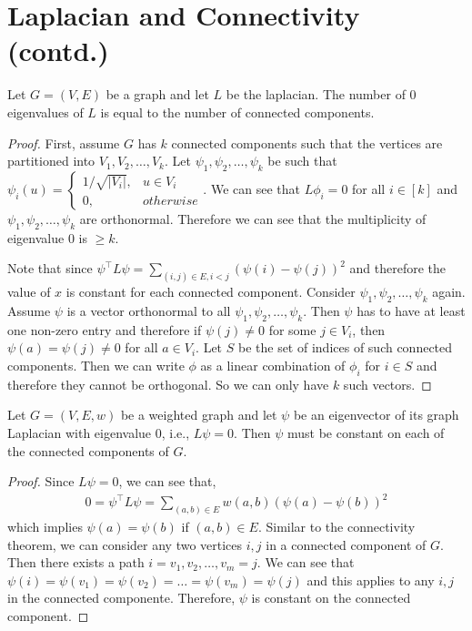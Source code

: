 \documentclass[11pt,letterpaper]{article}
\begin{document}
\section{Laplacian and Connectivity (contd.)}
\begin{theorem}
Let $G=(V,E)$ be a graph and let $L$ be the laplacian. The number of $0$ eigenvalues of $L$ is equal to the number of connected components.
\end{theorem}
\begin{proof}
First, assume $G$ has $k$ connected components such that the vertices are partitioned into $V_1,V_2,\dots,V_k$. Let $\psi_1,\psi_2,\dots,\psi_k$ be such that $\psi_i(u) = \begin{cases} 1/\sqrt{|V_i|}, & u\in V_i \\ 0, & otherwise\end{cases}$. We can see that $L\phi_i = 0$ for all $i \in [k]$ and $\psi_1,\psi_2,\dots,\psi_k$ are orthonormal. Therefore we can see that the multiplicity of eigenvalue $0$ is $\ge k$.

Note that since $\psi^\top L \psi = \sum_{(i,j) \in E, i<j}\left(\psi(i)-\psi(j)\right)^2$ and therefore the value of $x$ is constant for each connected component. Consider $\psi_1,\psi_2,\dots,\psi_k$ again. Assume $\psi$ is a vector orthonormal to all $\psi_1,\psi_2,\dots,\psi_k$. Then $\psi$ has to have at least one non-zero entry and therefore if $\psi(j) \neq 0$ for some $j \in V_i$, then $\psi(a) = \psi(j) \neq 0$ for all $a \in V_i$. Let $S$ be the set of indices of such connected components. Then we can write $\phi$ as a linear combination of $\phi_i$ for $i \in S$ and therefore they cannot be orthogonal. So we can only have $k$ such vectors. 
\end{proof}
\begin{theorem}
Let $G = (V,E,w)$ be a weighted graph and let $\psi$ be an eigenvector of its graph Laplacian with eigenvalue $0$, i.e., $L\psi = 0$. Then $\psi$ must be constant on each of the connected components of $G$.
\end{theorem}
\begin{proof}
Since $L\psi = 0$, we can see that,
\begin{align*}
0= \psi^\top L \psi = \sum_{(a,b) \in E} w(a,b) \left(\psi(a)-\psi(b)\right)^2
\end{align*}
which implies $\psi(a) = \psi(b)$ if $(a,b) \in E$. 
Similar to the connectivity theorem, we can consider any two vertices $i,j$ in a connected component of $G$. Then there exists a path $i = v_1,v_2,\dots,v_m=j$. We can see that $\psi(i) = \psi(v_1) = \psi(v_2) = \dots = \psi(v_m) = \psi(j)$ and this applies to any $i,j$ in the connected componente. Therefore, $\psi$ is constant on the connected component.
\end{proof}
\end{document}
